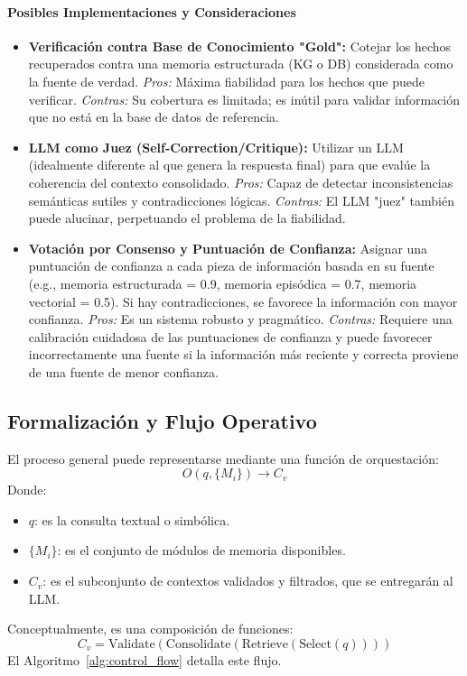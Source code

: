 \documentclass[conference]{IEEEtran}
\begin{document}
\paragraph{Posibles Implementaciones y Consideraciones}
\begin{itemize}
    \item \textbf{Verificación contra Base de Conocimiento "Gold":} Cotejar los hechos recuperados contra una memoria estructurada (KG o DB) considerada como la fuente de verdad. \textit{Pros:} Máxima fiabilidad para los hechos que puede verificar. \textit{Contras:} Su cobertura es limitada; es inútil para validar información que no está en la base de datos de referencia.
    \item \textbf{LLM como Juez (Self-Correction/Critique):} Utilizar un LLM (idealmente diferente al que genera la respuesta final) para que evalúe la coherencia del contexto consolidado. \textit{Pros:} Capaz de detectar inconsistencias semánticas sutiles y contradicciones lógicas. \textit{Contras:} El LLM "juez" también puede alucinar, perpetuando el problema de la fiabilidad.
    \item \textbf{Votación por Consenso y Puntuación de Confianza:} Asignar una puntuación de confianza a cada pieza de información basada en su fuente (e.g., memoria estructurada = 0.9, memoria episódica = 0.7, memoria vectorial = 0.5). Si hay contradicciones, se favorece la información con mayor confianza. \textit{Pros:} Es un sistema robusto y pragmático. \textit{Contras:} Requiere una calibración cuidadosa de las puntuaciones de confianza y puede favorecer incorrectamente una fuente si la información más reciente y correcta proviene de una fuente de menor confianza.
\end{itemize}

\subsection{Formalización y Flujo Operativo}
El proceso general puede representarse mediante una función de orquestación:
\[
O(q, \{M_i\}) \rightarrow C_v
\]
Donde:
\begin{itemize}
    \item $q$: es la consulta textual o simbólica.
    \item $\{M_i\}$: es el conjunto de módulos de memoria disponibles.
    \item $C_v$: es el subconjunto de contextos validados y filtrados, que se entregarán al LLM.
\end{itemize}
Conceptualmente, es una composición de funciones:
\[
C_v = \text{Validate}(\text{Consolidate}(\text{Retrieve}(\text{Select}(q))))
\]
El Algoritmo~\ref{alg:control_flow} detalla este flujo.
\end{document}
